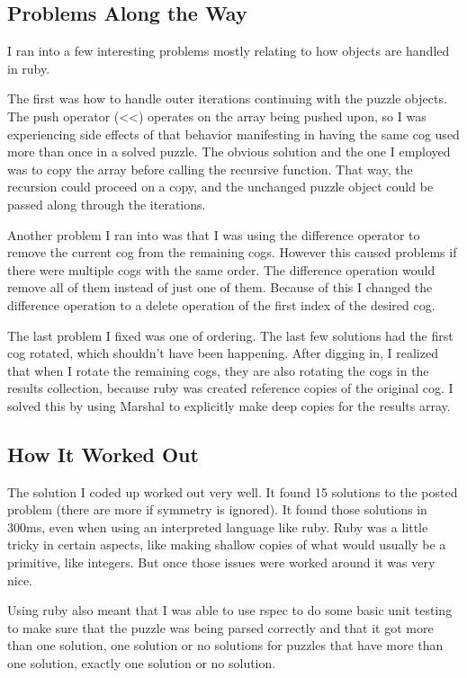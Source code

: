 \documentclass{article}
\begin{document}
\subsection{Problems Along the Way}
I ran into a few interesting problems mostly relating to how objects are handled in ruby.

The first was how to handle outer iterations continuing with the puzzle objects. The push operator (<<) operates on the array being pushed upon, so I was experiencing side effects of that behavior manifesting in having the same cog used more than once in a solved puzzle. The obvious solution and the one I employed was to copy the array before calling the recursive function. That way, the recursion could proceed on a copy, and the unchanged puzzle object could be passed along through the iterations.

Another problem I ran into was that I was using the difference operator to remove the current cog from the remaining cogs. However this caused problems if there were multiple cogs with the same order. The difference operation would remove all of them instead of just one of them. Because of this I changed the difference operation to a delete operation of the first index of the desired cog.

The last problem I fixed was one of ordering. The last few solutions had the first cog rotated, which shouldn't have been happening. After digging in, I realized that when I rotate the remaining cogs, they are also rotating the cogs in the results collection, because ruby was created reference copies of the original cog. I solved this by using Marshal to explicitly make deep copies for the results array.

\subsection{How It Worked Out}
The solution I coded up worked out very well. It found 15 solutions to the posted problem (there are more if symmetry is ignored). It found those solutions in 300ms, even when using an interpreted language like ruby. Ruby was a little tricky in certain aspects, like making shallow copies of what would usually be a primitive, like integers. But once those issues were worked around it was very nice.

Using ruby also meant that I was able to use rspec to do some basic unit testing to make sure that the puzzle was being parsed correctly and that it got more than one solution, one solution or no solutions for puzzles that have more than one solution, exactly one solution or no solution.
\end{document}
